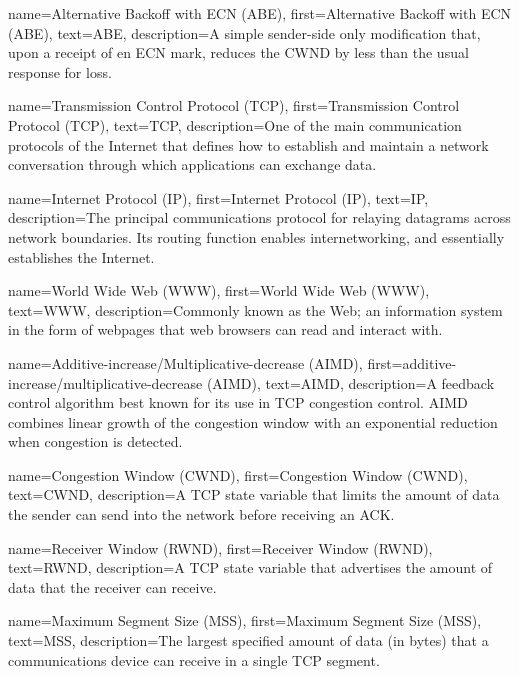 {
    name={Alternative Backoff with ECN (ABE)},
    first={Alternative Backoff with ECN (ABE)},
    text={ABE},
    description={A simple sender-side only modification that, upon a receipt of en ECN mark, reduces the CWND by less than the usual response for loss.}
}

{
    name={Transmission Control Protocol (TCP)},
    first={Transmission Control Protocol (TCP)},
    text={TCP},
    description={One of the main communication protocols of the Internet that defines how to establish and maintain a network conversation through which applications can exchange data.}
}

{
    name={Internet Protocol (IP)},
    first={Internet Protocol (IP)},
    text={IP},
    description={The principal communications protocol for relaying datagrams across network boundaries. Its routing function enables internetworking, and essentially establishes the Internet.}
}

{
    name={World Wide Web (WWW)},
    first={World Wide Web (WWW)},
    text={WWW},
    description={Commonly known as the Web; an information system in the form of webpages that web browsers can read and interact with.}
}

{
    name={Additive-increase/Multiplicative-decrease (AIMD)},
    first={additive-increase/multiplicative-decrease (AIMD)},
    text={AIMD},
    description={A feedback control algorithm best known for its use in TCP congestion control. AIMD combines linear growth of the congestion window with an exponential reduction when congestion is detected.}
}

{
    name={Congestion Window (CWND)},
    first={Congestion Window (CWND)},
    text={CWND},
    description={A TCP state variable that limits the amount of data the sender can send into the network before receiving an ACK.}
}

{
    name={Receiver Window (RWND)},
    first={Receiver Window (RWND)},
    text={RWND},
    description={A TCP state variable that advertises the amount of data that the receiver can receive.}
}

{
    name={Maximum Segment Size (MSS)},
    first={Maximum Segment Size (MSS)},
    text={MSS},
    description={The largest specified amount of data (in bytes) that a communications device can receive in a single TCP segment.}
}

